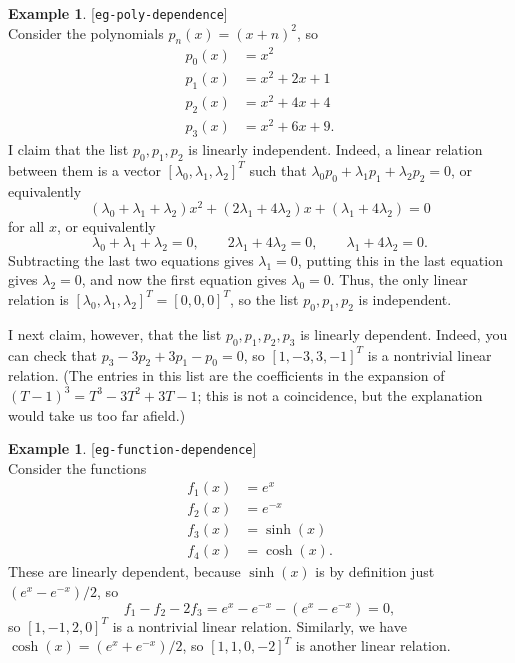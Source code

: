 \documentclass{amsart}
\newcommand{\lbl}[1]{\label{#1}\textup{[\texttt{#1}]}\ \\}
\newcommand{\lbl}{\label}
\newcommand{\lm}        {\lambda}
\renewcommand{\:}       {\colon}
\theoremstyle{definition}
\newtheorem{example}[theorem]{Example}
\begin{document}
\begin{example}\lbl{eg-poly-dependence}
 Consider the polynomials $p_n(x)=(x+n)^2$, so 
 \begin{align*}
   p_0(x) &= x^2 \\
   p_1(x) &= x^2 + 2x + 1 \\
   p_2(x) &= x^2 + 4x + 4 \\
   p_3(x) &= x^2 + 6x + 9.
 \end{align*}
 I claim that the list $p_0,p_1,p_2$ is linearly
 independent.  Indeed, a linear relation between them is a
 vector $[\lm_0,\lm_1,\lm_2]^T$ such that
 $\lm_0p_0+\lm_1p_1+\lm_2p_2=0$, or equivalently
 \[ (\lm_0+\lm_1+\lm_2)x^2 +
    (2\lm_1+4\lm_2)x +
    (\lm_1+4\lm_2) = 0
 \]
 for all $x$, or equivalently
 \[ \lm_0+\lm_1+\lm_2 = 0, \hspace{2em}
    2\lm_1+4\lm_2 = 0, \hspace{2em} 
    \lm_1+4\lm_2 = 0.
 \]
 Subtracting the last two equations gives $\lm_1=0$, putting
 this in the last equation gives $\lm_2=0$, and now the
 first equation gives $\lm_0=0$.  Thus, the only linear
 relation is $[\lm_0,\lm_1,\lm_2]^T=[0,0,0]^T$, so the list
 $p_0,p_1,p_2$ is independent.

 I next claim, however, that the list $p_0,p_1,p_2,p_3$ is
 linearly dependent.  Indeed, you can check that
 $p_3-3p_2+3p_1-p_0=0$, so $[1,-3,3,-1]^T$ is a nontrivial
 linear relation.  (The entries in this list are the
 coefficients in the expansion of $(T-1)^3=T^3-3T^2+3T-1$;
 this is not a coincidence, but the explanation would take
 us too far afield.)
\end{example}



\begin{example}\lbl{eg-function-dependence}
 Consider the functions 
 \begin{align*}
   f_1(x) &= e^x \\
   f_2(x) &= e^{-x} \\
   f_3(x) &= \sinh(x) \\
   f_4(x) &= \cosh(x).
 \end{align*}
 These are linearly dependent, because $\sinh(x)$ is by
 definition just $(e^x-e^{-x})/2$, so
 \[ f_1-f_2-2f_3 = e^x - e^{-x} - (e^x-e^{-x}) = 0, \]
 so $[1,-1,2,0]^T$ is a nontrivial linear relation.
 Similarly, we have $\cosh(x)=(e^x+e^{-x})/2$, so
 $[1,1,0,-2]^T$ is another linear relation.
\end{example}
\end{document}
